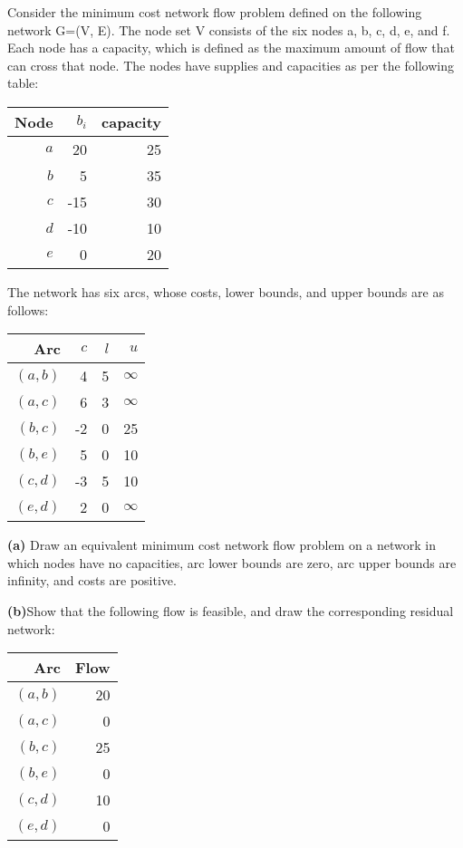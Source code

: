\documentclass[fleqn]{homework}
\begin{document}
  \begin{problem}{7}
    \begin{question}
      Consider the minimum cost network flow problem defined on the following
      network G=(V, E). The node set V consists of the six nodes a, b, c, d, e,
      and f. Each node has a capacity, which is defined as the maximum amount of
      flow that can cross that node. The nodes have supplies and capacities as
      per the following table:

      \begin{tabular}{rrr}
        \hline
        Node & $b_i$ & capacity \\
        \hline
        $a$ & 20 & 25 \\
        $b$ & 5 & 35 \\
        $c$ & -15 & 30 \\
        $d$ & -10 & 10 \\
        $e$ & 0 & 20 \\
        \hline
      \end{tabular}

      The network has six arcs, whose costs, lower bounds, and upper bounds are
      as follows:

      \begin{tabular}{rrrr}
        \hline
        Arc & $c$ & $l$ & $u$ \\
        \hline
        $(a, b)$ & 4 & 5 & $\infty$ \\
        $(a, c)$ & 6 & 3 & $\infty$ \\
        $(b, c)$ & -2 & 0 & 25 \\
        $(b, e)$ & 5 & 0 & 10 \\
        $(c, d)$ & -3 & 5 & 10 \\
        $(e, d)$ & 2 & 0 & $\infty$ \\
        \hline
      \end{tabular}

      \textbf{(a)} Draw an equivalent minimum cost network flow problem on a
      network in which nodes have no capacities, arc lower bounds are zero, arc
      upper bounds are infinity, and costs are positive.

      \textbf{(b)}Show that the following flow is feasible, and draw the
      corresponding residual network:

      \begin{tabular}{rr}
        \hline
        Arc & Flow \\
        \hline
        $(a, b)$ & 20 \\
        $(a, c)$ & 0 \\
        $(b, c)$ & 25 \\
        $(b, e)$ & 0 \\
        $(c, d)$ & 10 \\
        $(e, d)$ & 0 \\
        \hline
      \end{tabular}

    \end{question}
  \end{problem}
\end{document}
